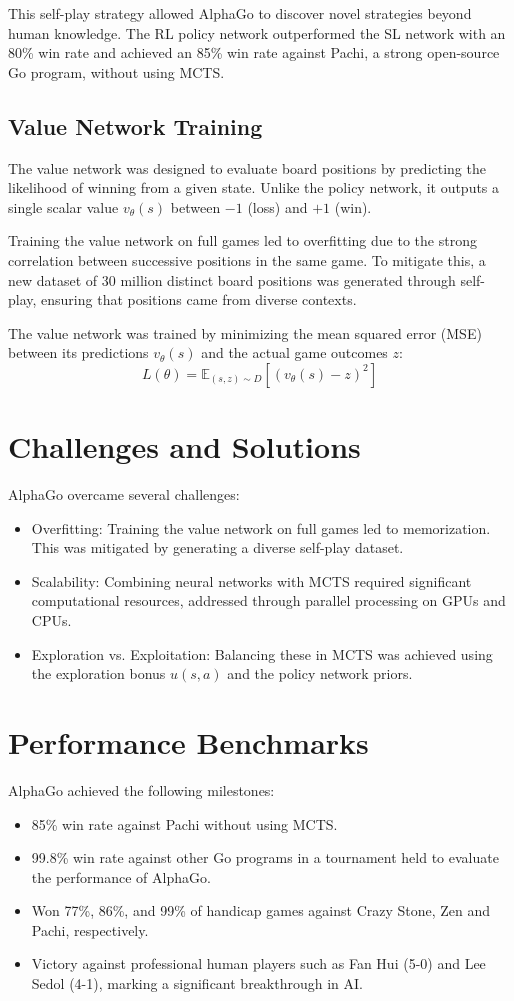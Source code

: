 \documentclass[conference]{IEEEtran}
\begin{document}
This self-play strategy allowed AlphaGo to discover novel strategies beyond human knowledge. The RL policy network outperformed the SL network with an 80\% win rate and achieved an 85\% win rate against Pachi, a strong open-source Go program, without using MCTS.

\subsection{Value Network Training}
The value network was designed to evaluate board positions by predicting the likelihood of winning from a given state. Unlike the policy network, it outputs a single scalar value \( v_\theta(s) \) between \(-1\) (loss) and \(+1\) (win).

Training the value network on full games led to overfitting due to the strong correlation between successive positions in the same game. To mitigate this, a new dataset of 30 million distinct board positions was generated through self-play, ensuring that positions came from diverse contexts.

The value network was trained by minimizing the mean squared error (MSE) between its predictions \( v_\theta(s) \) and the actual game outcomes \( z \):
\[
L(\theta) = \mathbb{E}_{(s, z) \sim D} \left[ (v_\theta(s) - z)^2 \right]
\]
\section{Challenges and Solutions}
AlphaGo overcame several challenges:
\begin{itemize}
    \item Overfitting: Training the value network on full games led to memorization. This was mitigated by generating a diverse self-play dataset.
    \item Scalability: Combining neural networks with MCTS required significant computational resources, addressed through parallel processing on GPUs and CPUs.
    \item Exploration vs. Exploitation: Balancing these in MCTS was achieved using the exploration bonus \( u(s, a) \) and the policy network priors.
\end{itemize}

\section{Performance Benchmarks}
AlphaGo achieved the following milestones:
\begin{itemize}
    \item 85\% win rate against Pachi without using MCTS.
    \item 99.8\% win rate against other Go programs in a tournament held to evaluate the performance of AlphaGo.
    \item Won 77\%, 86\%, and 99\% of handicap games against Crazy Stone, Zen and Pachi, respectively.
    \item Victory against professional human players such as Fan Hui (5-0) and Lee Sedol (4-1), marking a significant breakthrough in AI.
\end{itemize}
\end{document}
